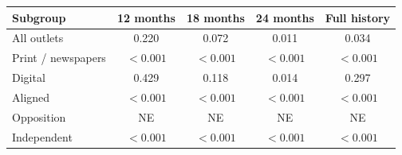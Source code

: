 \begingroup\small
\setlength{\tabcolsep}{3pt}
\renewcommand{\arraystretch}{1.25}
\noindent%
\begin{tabular*}{\linewidth}{@{\extracolsep{\fill}}lcccc@{}}
\toprule
Subgroup & 12 months & 18 months & 24 months & Full history \\
\midrule
All outlets & 0.220 & 0.072 & 0.011 & 0.034 \\
Print / newspapers & $<0.001$ & $<0.001$ & $<0.001$ & $<0.001$ \\
Digital & 0.429 & 0.118 & 0.014 & 0.297 \\
Aligned & $<0.001$ & $<0.001$ & $<0.001$ & $<0.001$ \\
Opposition & NE & NE & NE & NE \\
Independent & $<0.001$ & $<0.001$ & $<0.001$ & $<0.001$ \\
\bottomrule
\end{tabular*}\par\endgroup
